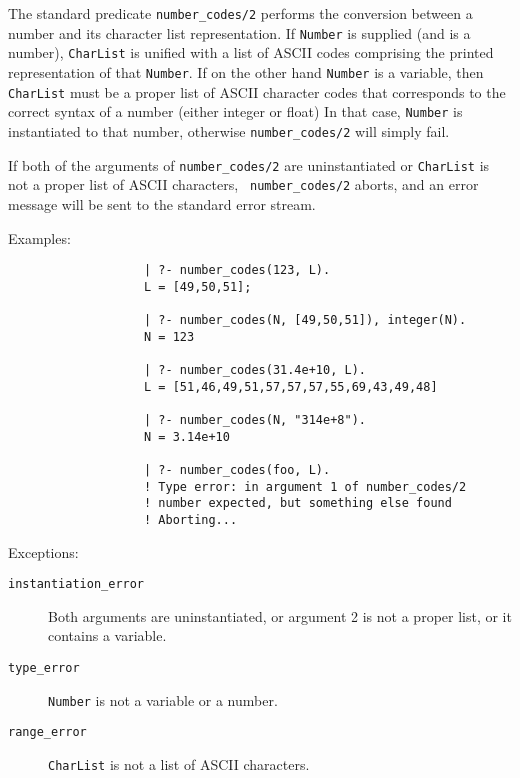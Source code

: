 \begin{description}
    The standard predicate {\tt number\_codes/2} performs the conversion 
    between a number and its character list representation. 
    If {\tt Number} is supplied (and is a number), {\tt CharList} is
    unified with a list of ASCII codes comprising the printed representation
    of that {\tt Number}.  If on the other hand {\tt Number} is a variable, 
    then {\tt CharList} must be a proper list of ASCII character codes that
    corresponds to the correct syntax of a number (either integer or float)
    In that case, {\tt Number} is instantiated to that number, otherwise
    {\tt number\_codes/2} will simply fail.

    If both of the arguments of {\tt number\_codes/2} are uninstantiated or
    {\tt CharList} is not a proper list of ASCII characters, {\tt
    number\_codes/2} aborts, and an error message will be sent to
    the standard error stream.

    Examples:
    {\footnotesize
     \begin{verbatim}
                   | ?- number_codes(123, L).
                   L = [49,50,51];

                   | ?- number_codes(N, [49,50,51]), integer(N).
                   N = 123

                   | ?- number_codes(31.4e+10, L).
                   L = [51,46,49,51,57,57,57,55,69,43,49,48]

                   | ?- number_codes(N, "314e+8").
                   N = 3.14e+10

                   | ?- number_codes(foo, L).
                   ! Type error: in argument 1 of number_codes/2
                   ! number expected, but something else found
                   ! Aborting...
     \end{verbatim}}

    Exceptions:
    \begin{description}
    \item[{\tt instantiation\_error}]
	Both arguments are uninstantiated, or argument 2
	is not a proper list, or it contains a variable.
    \item[{\tt type\_error}]
	{\tt Number} is not a variable or a number.
    \item[{\tt range\_error}]
	{\tt CharList} is not a list of ASCII characters.
    \end{description}


\end{description}
